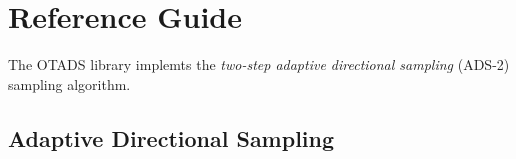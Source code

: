 % 




\section{Reference Guide}

The OTADS library implemts the \emph{two-step adaptive directional sampling} (ADS-2) sampling algorithm.\par

\subsection{Adaptive Directional Sampling}

